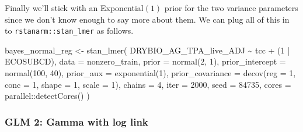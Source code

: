 \documentclass[12pt,twoside]{reedthesis}
\newenvironment{Shaded}{\begin{snugshade}}{\end{snugshade}}
\newcommand{\AttributeTok}[1]{\textcolor[rgb]{0.77,0.63,0.00}{#1}}
\newcommand{\DecValTok}[1]{\textcolor[rgb]{0.00,0.00,0.81}{#1}}
\newcommand{\FunctionTok}[1]{\textcolor[rgb]{0.00,0.00,0.00}{#1}}
\newcommand{\NormalTok}[1]{#1}
\newcommand{\OtherTok}[1]{\textcolor[rgb]{0.56,0.35,0.01}{#1}}
\newcommand{\SpecialCharTok}[1]{\textcolor[rgb]{0.00,0.00,0.00}{#1}}
\begin{document}
Finally we'll stick with an Exponential\((1)\) prior for the two variance parameters since we don't know enough to say more about them. We can plug all of this in to \texttt{rstanarm::stan\_lmer} as follows.
\begin{Shaded}
\begin{Highlighting}[]
\NormalTok{bayes\_normal\_reg }\OtherTok{\textless{}{-}} \FunctionTok{stan\_lmer}\NormalTok{(}
\NormalTok{  DRYBIO\_AG\_TPA\_live\_ADJ }\SpecialCharTok{\textasciitilde{}}\NormalTok{ tcc }\SpecialCharTok{+}\NormalTok{ (}\DecValTok{1} \SpecialCharTok{|}\NormalTok{ ECOSUBCD),}
  \AttributeTok{data =}\NormalTok{ nonzero\_train,}
  \AttributeTok{prior =} \FunctionTok{normal}\NormalTok{(}\DecValTok{2}\NormalTok{, }\DecValTok{1}\NormalTok{),}
  \AttributeTok{prior\_intercept =} \FunctionTok{normal}\NormalTok{(}\DecValTok{100}\NormalTok{, }\DecValTok{40}\NormalTok{),}
  \AttributeTok{prior\_aux =} \FunctionTok{exponential}\NormalTok{(}\DecValTok{1}\NormalTok{),}
  \AttributeTok{prior\_covariance =} \FunctionTok{decov}\NormalTok{(}\AttributeTok{reg =} \DecValTok{1}\NormalTok{, }\AttributeTok{conc =} \DecValTok{1}\NormalTok{, }\AttributeTok{shape =} \DecValTok{1}\NormalTok{, }\AttributeTok{scale =} \DecValTok{1}\NormalTok{),}
  \AttributeTok{chains =} \DecValTok{4}\NormalTok{, }\AttributeTok{iter =} \DecValTok{2000}\NormalTok{, }\AttributeTok{seed =} \DecValTok{84735}\NormalTok{,}
  \AttributeTok{cores =}\NormalTok{ parallel}\SpecialCharTok{::}\FunctionTok{detectCores}\NormalTok{()}
\NormalTok{)}
\end{Highlighting}
\end{Shaded}
\hypertarget{glm-2-gamma-with-log-link}{%
\subsubsection{GLM 2: Gamma with log link}\label{glm-2-gamma-with-log-link}}
\end{document}
